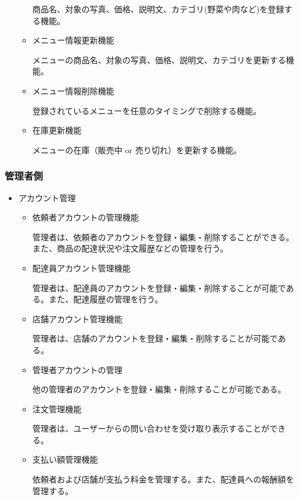 \begin{itemize}
\begin{itemize}
        商品名、対象の写真、価格、説明文、カテゴリ(野菜や肉など)を登録する機能。
        \item メニュー情報更新機能
        
        メニューの商品名、対象の写真、価格、説明文、カテゴリを更新する機能。
        \item メニュー情報削除機能
        
        登録されているメニューを任意のタイミングで削除する機能。

        \item 在庫更新機能
        
        メニューの在庫（販売中 or 売り切れ）を更新する機能。
    \end{itemize}
  
\end{itemize}

\subsubsection{管理者側}

\begin{itemize}
  \item アカウント管理
    \begin{itemize}
        \item 依頼者アカウントの管理機能
        
        管理者は、依頼者のアカウントを登録・編集・削除することができる。また、商品の配達状況や注文履歴などの管理を行う。


        \item 配達員アカウント管理機能
        
        管理者は、配達員のアカウントを登録・編集・削除することが可能である。また、配達履歴の管理を行う。

        \item 店舗アカウント管理機能

        管理者は、店舗のアカウントを登録・編集・削除することが可能である。
        
        \item 管理者アカウントの管理

        他の管理者のアカウントを登録・編集・削除することが可能である。
        
        \item 注文管理機能
        
        管理者は、ユーザーからの問い合わせを受け取り表示することができる。

        \item 支払い額管理機能

        依頼者および店舗が支払う料金を管理する。また、配達員への報酬額を管理する。


    \end{itemize}
  
\end{itemize}

